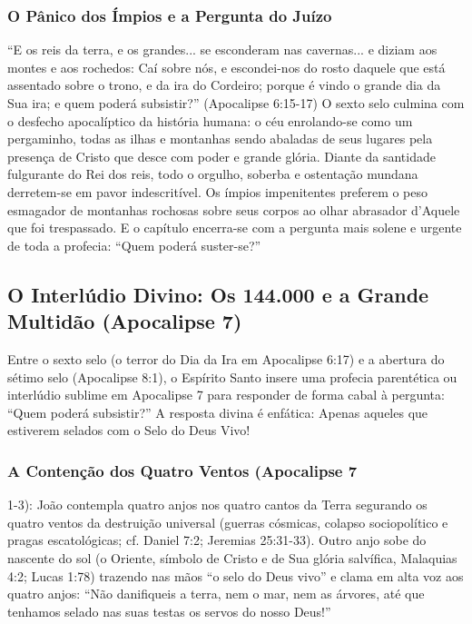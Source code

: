 \documentclass[11pt,a4paper,openany]{book}
\begin{document}
\subsubsection*{O Pânico dos Ímpios e a Pergunta do Juízo}
``E os reis da terra, e os grandes... se esconderam nas cavernas... e diziam aos montes e aos rochedos: Caí sobre nós, e escondei-nos do rosto daquele que está assentado sobre o trono, e da ira do Cordeiro; porque é vindo o grande dia da Sua ira; e quem poderá subsistir?'' (Apocalipse 6:15-17)
O sexto selo culmina com o desfecho apocalíptico da história humana: o céu enrolando-se como um pergaminho, todas as ilhas e montanhas sendo abaladas de seus lugares pela presença de Cristo que desce com poder e grande glória. Diante da santidade fulgurante do Rei dos reis, todo o orgulho, soberba e ostentação mundana derretem-se em pavor indescritível. Os ímpios impenitentes preferem o peso esmagador de montanhas rochosas sobre seus corpos ao olhar abrasador d'Aquele que foi trespassado. E o capítulo encerra-se com a pergunta mais solene e urgente de toda a profecia: ``Quem poderá suster-se?''



\subsection{O Interlúdio Divino: Os 144.000 e a Grande Multidão (Apocalipse 7)}


Entre o sexto selo (o terror do Dia da Ira em Apocalipse 6:17) e a abertura do sétimo selo (Apocalipse 8:1), o Espírito Santo insere uma profecia parentética ou interlúdio sublime em Apocalipse 7 para responder de forma cabal à pergunta: ``Quem poderá subsistir?''
A resposta divina é enfática: Apenas aqueles que estiverem selados com o Selo do Deus Vivo!


\subsubsection*{A Contenção dos Quatro Ventos (Apocalipse 7}
1-3):
João contempla quatro anjos nos quatro cantos da Terra segurando os quatro ventos da destruição universal (guerras cósmicas, colapso sociopolítico e pragas escatológicas; cf. Daniel 7:2; Jeremias 25:31-33). Outro anjo sobe do nascente do sol (o Oriente, símbolo de Cristo e de Sua glória salvífica, Malaquias 4:2; Lucas 1:78) trazendo nas mãos ``o selo do Deus vivo'' e clama em alta voz aos quatro anjos: ``Não danifiqueis a terra, nem o mar, nem as árvores, até que tenhamos selado nas suas testas os servos do nosso Deus!''
\end{document}
